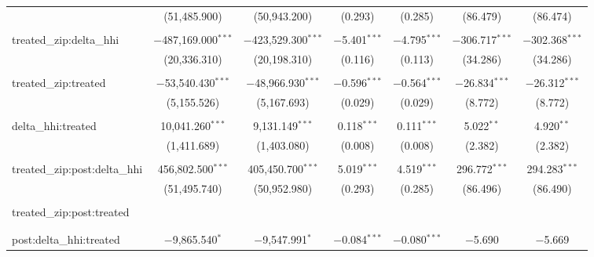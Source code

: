 \begin{table}[H]
{\begin{tabular}{@{\extracolsep{5pt}}lcccccc}
   & (51,485.900) & (50,943.200) & (0.293) & (0.285) & (86.479) & (86.474) \\  

   & & & & & & \\  

  treated\_zip:delta\_hhi & $-$487,169.000$^{***}$ & $-$423,529.300$^{***}$ & $-$5.401$^{***}$ & $-$4.795$^{***}$ & $-$306.717$^{***}$ & $-$302.368$^{***}$ \\  

   & (20,336.310) & (20,198.310) & (0.116) & (0.113) & (34.286) & (34.286) \\  

   & & & & & & \\  

  treated\_zip:treated & $-$53,540.430$^{***}$ & $-$48,966.930$^{***}$ & $-$0.596$^{***}$ & $-$0.564$^{***}$ & $-$26.834$^{***}$ & $-$26.312$^{***}$ \\  

   & (5,155.526) & (5,167.693) & (0.029) & (0.029) & (8.772) & (8.772) \\  

   & & & & & & \\  

  delta\_hhi:treated & 10,041.260$^{***}$ & 9,131.149$^{***}$ & 0.118$^{***}$ & 0.111$^{***}$ & 5.022$^{**}$ & 4.920$^{**}$ \\  

   & (1,411.689) & (1,403.080) & (0.008) & (0.008) & (2.382) & (2.382) \\  

   & & & & & & \\  

  treated\_zip:post:delta\_hhi & 456,802.500$^{***}$ & 405,450.700$^{***}$ & 5.019$^{***}$ & 4.519$^{***}$ & 296.772$^{***}$ & 294.283$^{***}$ \\  

   & (51,495.740) & (50,952.980) & (0.293) & (0.285) & (86.496) & (86.490) \\  

   & & & & & & \\  

  treated\_zip:post:treated &  &  &  &  &  &  \\  

   &  &  &  &  &  &  \\  

   & & & & & & \\  

  post:delta\_hhi:treated & $-$9,865.540$^{*}$ & $-$9,547.991$^{*}$ & $-$0.084$^{***}$ & $-$0.080$^{***}$ & $-$5.690 & $-$5.669 \\  


\end{tabular}}
\end{table}
